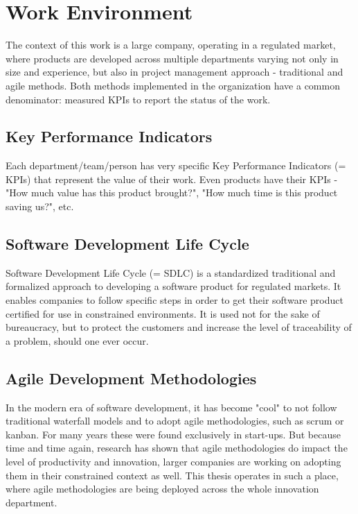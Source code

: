 \newpage

\section{Work Environment}

The context of this work is a large company, operating in a regulated market, where products are developed across multiple departments varying not only in size and experience, but also in project management approach - traditional and agile methods. Both methods implemented in the organization have a common denominator: measured KPIs to report the status of the work.

\subsection{Key Performance Indicators}

Each department/team/person has very specific Key Performance Indicators (= KPIs) \cite{weber2005key} that represent the value of their work. Even products have their KPIs - "How much value has this product brought?", "How much time is this product saving us?", etc.

\subsection{Software Development Life Cycle}

Software Development Life Cycle (= SDLC) is a standardized traditional and formalized approach to developing a software product for regulated markets. It enables companies to follow specific steps in order to get their software product certified for use in constrained environments. It is used not for the sake of bureaucracy, but to protect the customers and increase the level of traceability of a problem, should one ever occur.

\subsection{Agile Development Methodologies}

In the modern era of software development, it has become "cool" to not follow traditional waterfall models and to adopt agile methodologies, such as scrum or kanban. For many years these were found exclusively in start-ups. But because time and time again, research \cite{947100} has shown that agile methodologies do impact the level of productivity and innovation, larger companies are working on adopting them in their constrained context as well. This thesis operates in such a place, where agile methodologies are being deployed across the whole innovation department.


